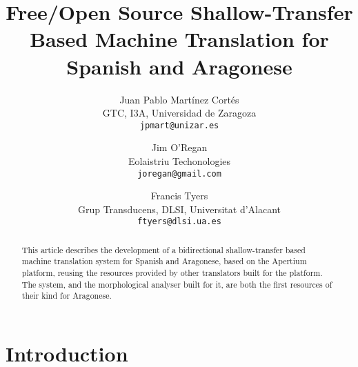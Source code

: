 \documentclass[10pt, a4paper]{article}
\title{Free/Open Source Shallow-Transfer Based Machine Translation for Spanish and Aragonese} %
\author{Juan Pablo Mart\'inez Cort\'es\\ GTC, I3A, Universidad de Zaragoza \\ {\tt jpmart@unizar.es}
\and Jim O’Regan\\ Eolaistriu Techonologies \\ {\tt joregan@gmail.com}
\and Francis Tyers\\ Grup Transducens, DLSI, Universitat d'Alacant \\ {\tt ftyers@dlsi.ua.es}}
\begin{document}
  \maketitle
  \begin{abstract}
  This article describes the development of a bidirectional shallow-transfer based machine translation system for Spanish and Aragonese, based on the Apertium platform, reusing the resources provided by other translators built for the platform. The system, and the morphological analyser built for it, are both the first resources of their kind for Aragonese. %
  \end{abstract}
  
  \section{Introduction}
\end{document}
